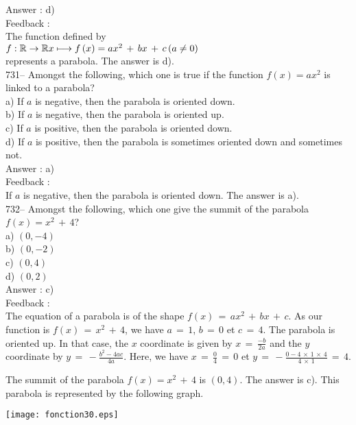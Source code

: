\documentclass[letterpaper, 12pt]{article}
\begin{document}
Answer : d)\\

Feedback : \\
The function defined by \\
$f :\mathbb{R}\rightarrow\mathbb{R}\\
x\longmapsto f\left( x\right) =ax^{2}\,+\,bx\,+\,c \left( a\neq 0 \right)$
\\
represents a parabola.  The answer is d).\\

731-- Amongst the following, which one is true if the function $f(x)=ax^{2}$ is linked to a parabola?\\
a) If $a$ is negative, then the parabola is oriented down.\\
b) If $a$ is negative, then the parabola is oriented up.  \\
c) If $a$ is positive, then the parabola is oriented down.\\
d) If $a$ is positive, then the parabola is sometimes oriented down and sometimes not.\\

Answer : a)\\

Feedback : \\
If $a$ is negative, then the parabola is oriented down. The answer is a).\\

732-- Amongst the following, which one give the summit of the parabola
$f\left( x\right) =x^{2}\,+\,4$?\\
a) $(0,-4)$\\
b) $(0,-2)$\\
c) $(0,4)$\\
d) $(0,2)$\\

Answer : c)\\

Feedback : \\
The equation of a parabola is of the shape
$f(x)\,=\,ax^2\,+\,bx\,+\,c$. As our function is 
$f(x)\,=\,x^2\,+\,4$, we have $a\,=\,1$, $b\,=\,0$ et $c\,=\,4$.
The parabola is oriented up. In that case, the $x$ coordinate is given by $x\,=\, \frac{-b}{2a}$ and the $y$ coordinate by $y\,=\, -\frac{b^2-4ac}{4a}$. Here, we have
$x\,=\,\frac{0}{4}\,=\,0$ et
$y\,=\,-\frac{0-4\,\times\,1\,\times\,4}{4\,\times\,1}\,=\,4$. 


The summit of the parabola $f\left( x\right) =x^{2}\,+\,4$ is $(0,4)$.  The answer is c).  
This parabola is represented by the following graph.\\
    \begin{center}
    \texttt{[image: fonction30.eps]}
    \end{center}
\end{document}
